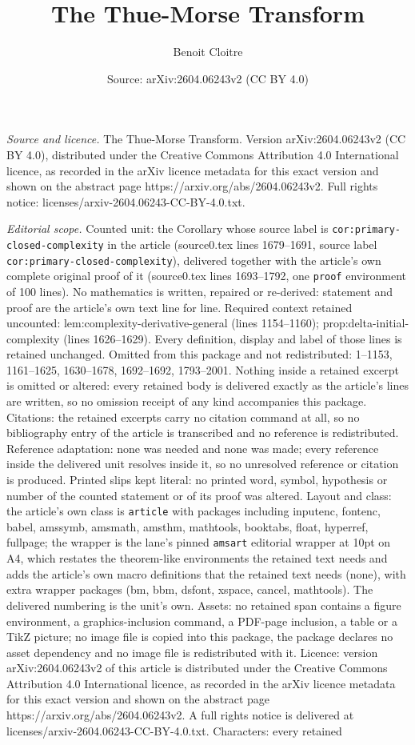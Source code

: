 \documentclass[10pt,a4paper]{amsart}
\title[The Thue-Morse Transform]{The Thue-Morse Transform}
\author{Benoit Cloitre}
\date{Source: arXiv:2604.06243v2 (CC BY 4.0)}
\begin{document}
\maketitle

\noindent\emph{Source and licence.} The Thue-Morse Transform. Version arXiv:2604.06243v2 (CC BY 4.0), distributed under the Creative Commons Attribution 4.0 International licence, as recorded in the arXiv licence metadata for this exact version and shown on the abstract page https://arxiv.org/abs/2604.06243v2. Full rights notice: licenses/arxiv-2604.06243-CC-BY-4.0.txt.\par\smallskip

\noindent\textit{Editorial scope.} Counted unit: the Corollary whose source label is \texttt{cor:primary-closed-complexity} in the article (source0.tex lines 1679--1691, source label \texttt{cor:primary-closed-complexity}), delivered together with the article's own complete original proof of it (source0.tex lines 1693--1792, one \texttt{proof} environment of 100 lines). No mathematics is written, repaired or re-derived: statement and proof are the article's own text line for line. Required context retained uncounted: lem:complexity-derivative-general (lines 1154--1160); prop:delta-initial-complexity (lines 1626--1629). Every definition, display and label of those lines is retained unchanged. Omitted from this package and not redistributed: 1--1153, 1161--1625, 1630--1678, 1692--1692, 1793--2001. Nothing inside a retained excerpt is omitted or altered: every retained body is delivered exactly as the article's lines are written, so no omission receipt of any kind accompanies this package. Citations: the retained excerpts carry no citation command at all, so no bibliography entry of the article is transcribed and no reference is redistributed. Reference adaptation: none was needed and none was made; every reference inside the delivered unit resolves inside it, so no unresolved reference or citation is produced. Printed slips kept literal: no printed word, symbol, hypothesis or number of the counted statement or of its proof was altered. Layout and class: the article's own class is \texttt{article} with packages including inputenc, fontenc, babel, amssymb, amsmath, amsthm, mathtools, booktabs, float, hyperref, fullpage; the wrapper is the lane's pinned \texttt{amsart} editorial wrapper at 10pt on A4, which restates the theorem-like environments the retained text needs and adds the article's own macro definitions that the retained text needs (none), with extra wrapper packages (bm, bbm, dsfont, xspace, cancel, mathtools). The delivered numbering is the unit's own. Assets: no retained span contains a figure environment, a graphics-inclusion command, a PDF-page inclusion, a table or a TikZ picture; no image file is copied into this package, the package declares no asset dependency and no image file is redistributed with it. Licence: version arXiv:2604.06243v2 of this article is distributed under the Creative Commons Attribution 4.0 International licence, as recorded in the arXiv licence metadata for this exact version and shown on the abstract page https://arxiv.org/abs/2604.06243v2. A full rights notice is delivered at licenses/arxiv-2604.06243-CC-BY-4.0.txt. Characters: every retained 
\end{document}
